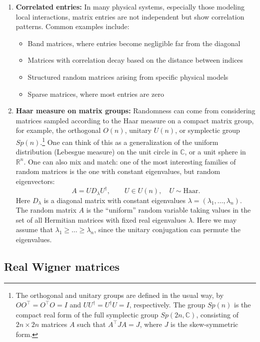 \documentclass[letterpaper,11pt,oneside,reqno]{article}
\numberwithin{equation}{section}
\theoremstyle{definition}
\begin{document}
\begin{enumerate}
\item \textbf{Correlated entries:}
In many physical systems, especially those modeling local interactions, matrix entries are not independent but show correlation patterns. Common examples include:
\begin{itemize}
\item Band matrices, where entries become negligible far from the diagonal
\item Matrices with correlation decay based on the distance between indices
\item Structured random matrices arising from specific physical models
\item Sparse matrices, where most entries are zero
\end{itemize}
\item \textbf{Haar measure on matrix groups:}
Randomness can come from considering matrices sampled according to the Haar measure on a compact matrix group,
for example, the orthogonal $O(n)$, unitary $U(n)$, or symplectic group $Sp(n)$.\footnote{The
	orthogonal and unitary groups are defined
	in the usual way, by $OO^\top=O^\top O=I$ and $UU^\dagger
	=U^\dagger U=I$, respectively.
	The
	group $Sp(n)$ is the compact real form of the full symplectic group $Sp(2n, \mathbb{C})$,
	consisting of $2n\times 2n$ matrices $A$ such that $A^\top JA=J$, where
	$J$ is the skew-symmetric form.}
One can think of this as a generalization of
the uniform distribution (Lebesgue measure) on the unit circle in $\mathbb{C}$,
or a unit sphere in $\mathbb{R}^n$.
One can also mix and match: one
of the most interesting families of random matrices is the one
with constant eigenvalues, but random eigenvectors:
\begin{equation*}
	A=UD_\lambda U^\dagger,\qquad U\in U(n), \quad U\sim \mathrm{Haar}.
\end{equation*}
Here $D_\lambda$ is a diagonal matrix with constant eigenvalues $\lambda=(\lambda_1,\ldots,\lambda_n)$.
The random matrix $A$ is the ``uniform'' random variable
taking values in the set of all Hermitian matrices with fixed real eigenvalues $\lambda$.
Here we may assume that $\lambda_1\ge \ldots\ge \lambda_n $,
since the unitary conjugation can permute the eigenvalues.
\end{enumerate}

\subsection{Real Wigner matrices}
\end{document}
